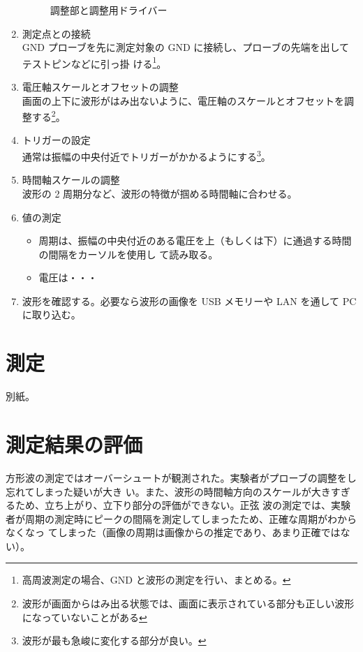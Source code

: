 \documentclass{ltjsarticle}
\begin{document}
\begin{enumerate}
\begin{figure}[h]
              \caption{調整部と調整用ドライバー}
          \end{figure}
    \item 測定点との接続\\GND プローブを先に測定対象の GND に接続し、プローブの先端を出してテストピンなどに引っ掛
          ける\footnote{高周波測定の場合、GND と波形の測定を行い、まとめる。}。
    \item 電圧軸スケールとオフセットの調整\\画面の上下に波形がはみ出ないように、電圧軸のスケールとオフセットを調整する\footnote{波形が画面からはみ出る状態では、画面に表示されている部分も正しい波形になっていないことがある}。
    \item トリガーの設定\\通常は振幅の中央付近でトリガーがかかるようにする\footnote{波形が最も急峻に変化する部分が良い。}。
    \item 時間軸スケールの調整\\波形の 2 周期分など、波形の特徴が掴める時間軸に合わせる。
    \item 値の測定
          \begin{itemize}
              \item 周期は、振幅の中央付近のある電圧を上（もしくは下）に通過する時間の間隔をカーソルを使用し
                    て読み取る。
              \item 電圧は・・・
          \end{itemize}
    \item 波形を確認する。必要なら波形の画像を USB メモリーや LAN を通して PC に取り込む。

\end{enumerate}

\section*{測定}
別紙。

\section*{測定結果の評価}
方形波の測定ではオーバーシュートが観測された。実験者がプローブの調整をし忘れてしまった疑いが大き
い。また、波形の時間軸方向のスケールが大きすぎるため、立ち上がり、立下り部分の評価ができない。正弦
波の測定では、実験者が周期の測定時にピークの間隔を測定してしまったため、正確な周期がわからなくなっ
てしまった（画像の周期は画像からの推定であり、あまり正確ではない）。
\end{document}
